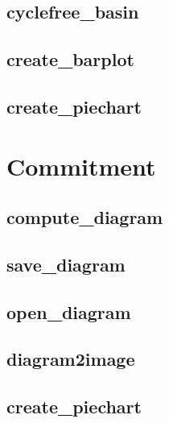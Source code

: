 \documentclass[letterpaper,10pt,english]{sphinxmanual}
\begin{document}
\subsection{cyclefree\_basin}
\label{\detokenize{Basins:cyclefree-basin}}\label{\detokenize{Basins:id3}}

\subsection{create\_barplot}
\label{\detokenize{Basins:id4}}\label{\detokenize{Basins:create-barplot}}

\subsection{create\_piechart}
\label{\detokenize{Basins:create-piechart}}\label{\detokenize{Basins:basins-create-piechart}}

\section{Commitment}
\label{\detokenize{Commitment::doc}}\label{\detokenize{Commitment:commitment}}\label{\detokenize{Commitment:id1}}

\subsection{compute\_diagram}
\label{\detokenize{Commitment:commitment-compute-diagram}}\label{\detokenize{Commitment:compute-diagram}}

\subsection{save\_diagram}
\label{\detokenize{Commitment:commitment-save-diagram}}\label{\detokenize{Commitment:save-diagram}}

\subsection{open\_diagram}
\label{\detokenize{Commitment:open-diagram}}\label{\detokenize{Commitment:commitment-open-diagram}}

\subsection{diagram2image}
\label{\detokenize{Commitment:diagram2image}}\label{\detokenize{Commitment:commitment-diagram2image}}

\subsection{create\_piechart}
\label{\detokenize{Commitment:commitment-create-piechart}}\label{\detokenize{Commitment:create-piechart}}
\end{document}
